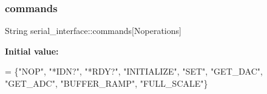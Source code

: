 \subsubsection{\texorpdfstring{commands}{commands}}
{\footnotesize\ttfamily String serial\+\_\+interface\+::commands\mbox{[}Noperations\mbox{]}}

{\bfseries Initial value\+:}
\begin{DoxyCode}
= \{\textcolor{stringliteral}{"NOP"},
                                \textcolor{stringliteral}{"*IDN?"},
                                \textcolor{stringliteral}{"*RDY?"},
                                \textcolor{stringliteral}{"INITIALIZE"},
                                \textcolor{stringliteral}{"SET"},
                                \textcolor{stringliteral}{"GET\_DAC"},
                                \textcolor{stringliteral}{"GET\_ADC"},
                                \textcolor{stringliteral}{"BUFFER\_RAMP"},
                                \textcolor{stringliteral}{"FULL\_SCALE"}\}
\end{DoxyCode}
